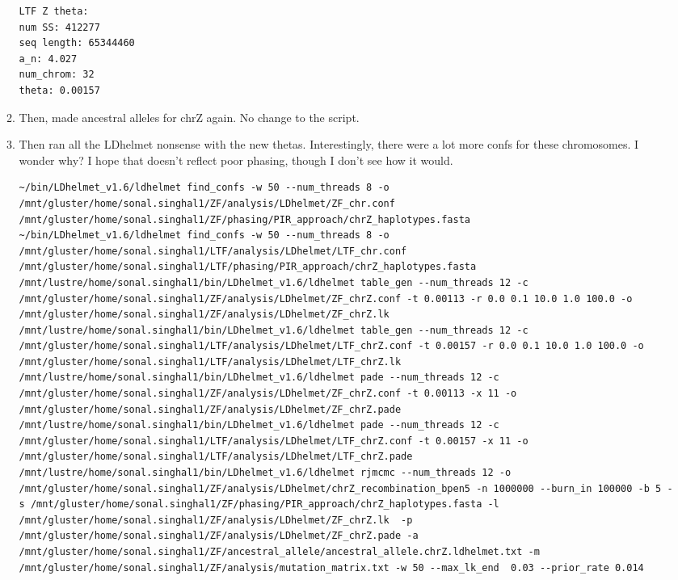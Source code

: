 \documentclass[idxtotoc,hyperref,openany,oneside]{labbook} %
\begin{document}
\begin{enumerate}
\begin{enumerate}
\begin{verbatim}
LTF Z theta:
num SS: 412277
seq length: 65344460
a_n: 4.027
num_chrom: 32
theta: 0.00157
\end{verbatim}
\item Then, made ancestral alleles for chrZ again. No change to the script.
\item Then ran all the LDhelmet nonsense with the new thetas. Interestingly, there were a lot more confs for these chromosomes. I wonder why? I hope that doesn't reflect poor phasing, though I don't see how it would.
\begin{verbatim}
~/bin/LDhelmet_v1.6/ldhelmet find_confs -w 50 --num_threads 8 -o /mnt/gluster/home/sonal.singhal1/ZF/analysis/LDhelmet/ZF_chr.conf /mnt/gluster/home/sonal.singhal1/ZF/phasing/PIR_approach/chrZ_haplotypes.fasta
~/bin/LDhelmet_v1.6/ldhelmet find_confs -w 50 --num_threads 8 -o /mnt/gluster/home/sonal.singhal1/LTF/analysis/LDhelmet/LTF_chr.conf /mnt/gluster/home/sonal.singhal1/LTF/phasing/PIR_approach/chrZ_haplotypes.fasta
/mnt/lustre/home/sonal.singhal1/bin/LDhelmet_v1.6/ldhelmet table_gen --num_threads 12 -c /mnt/gluster/home/sonal.singhal1/ZF/analysis/LDhelmet/ZF_chrZ.conf -t 0.00113 -r 0.0 0.1 10.0 1.0 100.0 -o /mnt/gluster/home/sonal.singhal1/ZF/analysis/LDhelmet/ZF_chrZ.lk 
/mnt/lustre/home/sonal.singhal1/bin/LDhelmet_v1.6/ldhelmet table_gen --num_threads 12 -c /mnt/gluster/home/sonal.singhal1/LTF/analysis/LDhelmet/LTF_chrZ.conf -t 0.00157 -r 0.0 0.1 10.0 1.0 100.0 -o /mnt/gluster/home/sonal.singhal1/LTF/analysis/LDhelmet/LTF_chrZ.lk 
/mnt/lustre/home/sonal.singhal1/bin/LDhelmet_v1.6/ldhelmet pade --num_threads 12 -c /mnt/gluster/home/sonal.singhal1/ZF/analysis/LDhelmet/ZF_chrZ.conf -t 0.00113 -x 11 -o /mnt/gluster/home/sonal.singhal1/ZF/analysis/LDhelmet/ZF_chrZ.pade
/mnt/lustre/home/sonal.singhal1/bin/LDhelmet_v1.6/ldhelmet pade --num_threads 12 -c /mnt/gluster/home/sonal.singhal1/LTF/analysis/LDhelmet/LTF_chrZ.conf -t 0.00157 -x 11 -o /mnt/gluster/home/sonal.singhal1/LTF/analysis/LDhelmet/LTF_chrZ.pade
/mnt/lustre/home/sonal.singhal1/bin/LDhelmet_v1.6/ldhelmet rjmcmc --num_threads 12 -o /mnt/gluster/home/sonal.singhal1/ZF/analysis/LDhelmet/chrZ_recombination_bpen5 -n 1000000 --burn_in 100000 -b 5 -s /mnt/gluster/home/sonal.singhal1/ZF/phasing/PIR_approach/chrZ_haplotypes.fasta -l /mnt/gluster/home/sonal.singhal1/ZF/analysis/LDhelmet/ZF_chrZ.lk  -p /mnt/gluster/home/sonal.singhal1/ZF/analysis/LDhelmet/ZF_chrZ.pade -a /mnt/gluster/home/sonal.singhal1/ZF/ancestral_allele/ancestral_allele.chrZ.ldhelmet.txt -m /mnt/gluster/home/sonal.singhal1/ZF/analysis/mutation_matrix.txt -w 50 --max_lk_end  0.03 --prior_rate 0.014

\end{verbatim}
\end{enumerate}
\end{enumerate}
\end{document}
